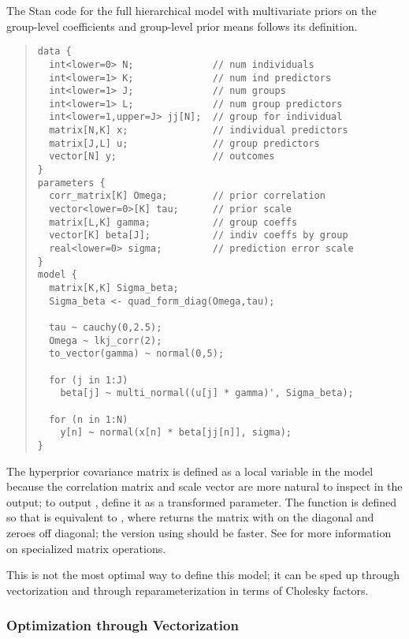 The Stan code for the full hierarchical model with multivariate priors
on the group-level coefficients and group-level prior means follows
its definition.
%
\begin{quote}\small
\begin{Verbatim}
data {
  int<lower=0> N;              // num individuals
  int<lower=1> K;              // num ind predictors
  int<lower=1> J;              // num groups
  int<lower=1> L;              // num group predictors
  int<lower=1,upper=J> jj[N];  // group for individual
  matrix[N,K] x;               // individual predictors
  matrix[J,L] u;               // group predictors
  vector[N] y;                 // outcomes
}
parameters {
  corr_matrix[K] Omega;        // prior correlation
  vector<lower=0>[K] tau;      // prior scale
  matrix[L,K] gamma;           // group coeffs
  vector[K] beta[J];           // indiv coeffs by group
  real<lower=0> sigma;         // prediction error scale
}
model {
  matrix[K,K] Sigma_beta;
  Sigma_beta <- quad_form_diag(Omega,tau);

  tau ~ cauchy(0,2.5);
  Omega ~ lkj_corr(2);
  to_vector(gamma) ~ normal(0,5);

  for (j in 1:J)
    beta[j] ~ multi_normal((u[j] * gamma)', Sigma_beta);

  for (n in 1:N)
    y[n] ~ normal(x[n] * beta[jj[n]], sigma);
}
\end{Verbatim}
\end{quote}
%
The hyperprior covariance matrix is defined as a local variable in the
model because the correlation matrix  and scale vector
 are more natural to inspect in the output; to output
, define it as a transformed parameter.  The function
 is defined so that
 is equivalent to
, where
 returns the matrix with  on the
diagonal and zeroes off diagonal; the version using
 should be faster.  See
 for more information on
specialized matrix operations.

This is not the most optimal way to define this model;  it can be sped
up through vectorization and through reparameterization in terms of
Cholesky factors.

\subsubsection{Optimization through Vectorization}

